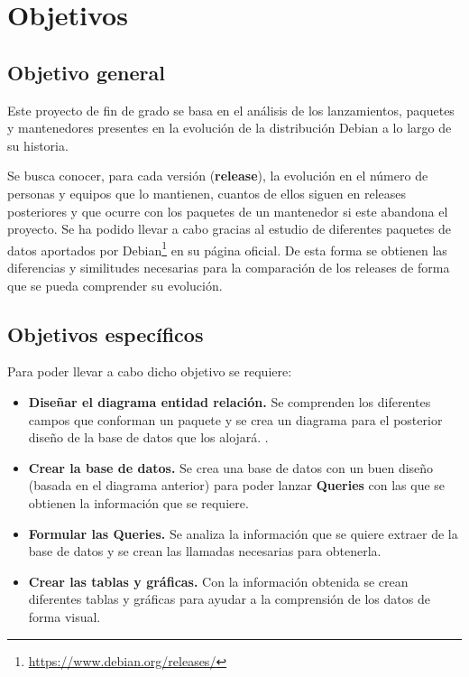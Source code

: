 \documentclass[a4paper, 12pt]{book}
\begin{document}
\cleardoublepage %
\chapter{Objetivos} %
\label{chap:objetivos} %



\section{Objetivo general} %
\label{sec:objetivo-general} %

Este proyecto de fin de grado se basa en el análisis de los lanzamientos, paquetes y mantenedores presentes en la evolución de la distribución Debian a lo largo de su historia. 

Se busca conocer, para cada versión (\textbf{release}), la evolución en el número de personas y equipos que lo mantienen,  cuantos de ellos siguen en releases posteriores y que ocurre con los paquetes de un mantenedor si este abandona el proyecto. Se ha podido llevar a cabo gracias al estudio de diferentes paquetes de datos aportados por Debian\footnote{\url{https://www.debian.org/releases/}} en su página oficial.
De esta forma se obtienen las diferencias y similitudes necesarias para la comparación de los releases de forma que se pueda comprender su evolución.


\section{Objetivos específicos}
\label{sec:objetivos-especificos}

Para poder llevar a cabo dicho objetivo se requiere: 

\begin{itemize}
	\item \textbf {Diseñar el diagrama entidad relación.} Se comprenden los diferentes campos que conforman un paquete y se crea un diagrama para el posterior diseño de la base de datos que los alojará.
	.
	\item \textbf {Crear la base de datos.} Se crea una base de datos con un buen diseño (basada en el diagrama anterior) para poder lanzar \textbf {Queries} con las que se obtienen la información que se requiere.
	
	\item \textbf {Formular las Queries.} Se analiza la información que se quiere extraer de la base de datos y se crean las llamadas necesarias para obtenerla.
	
	
	\item \textbf {Crear las tablas y gráficas.} Con la información obtenida se crean diferentes tablas y gráficas para ayudar a la comprensión de los datos de forma visual.
\end{itemize}
\end{document}
